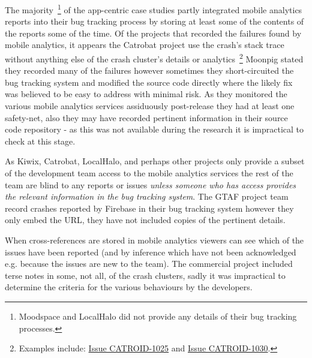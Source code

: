 The 
majority~\footnote{Moodspace and LocalHalo did not provide any details of their bug tracking processes.} of the app-centric case studies partly integrated mobile analytics reports into their bug tracking process by storing at least some of the contents of the reports some of the time.  
Of the projects that recorded the failures found by mobile analytics, it appears the Catrobat project use the crash's stack trace without anything else of the crash cluster's details or analytics~\footnote{Examples include: \href{https://jira.catrob.at/browse/CATROID-1025}{Issue CATROID-1025} and \href{https://jira.catrob.at/browse/CATROID-1030}{Issue CATROID-1030}.} Moonpig stated they recorded many of the failures however sometimes they short-circuited the bug tracking system and modified the source code directly where the likely fix was believed to be easy to address with minimal risk. As they monitored the various mobile analytics services assiduously post-release they had at least one safety-net, also they may have recorded pertinent information in their source code repository - as this was not available during the research it is impractical to check at this stage.

As Kiwix, Catrobat, LocalHalo, and perhaps other projects only provide a subset of the development team access to the mobile analytics services the rest of the team are blind to any reports or issues \textit{unless someone who has access provides the relevant information in the bug tracking system}. The GTAF project team record crashes reported by Firebase in their bug tracking system however they only embed the URL, they have not included copies of the pertinent details.

When cross-references are stored in mobile analytics viewers can see which of the issues have been reported (and by inference which have not been acknowledged e.g. because the issues are new to the team). The commercial project included terse notes in some, not all, of the crash clusters, sadly it was impractical to determine the criteria for the various behaviours by the developers. 

